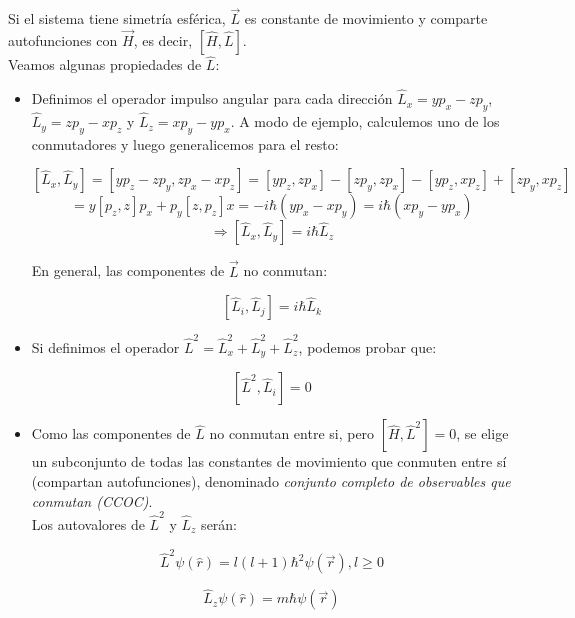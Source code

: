 \documentclass[a4paper]{article}
\begin{document}
Si el sistema tiene simetr\'ia esf\'erica, $\vec{L}$ es constante de movimiento y comparte autofunciones con $\vec{H}$, es decir, $[\hat{H},\hat{L}]$.\\

Veamos algunas propiedades de $\hat{L}$:

\begin{itemize}
\item Definimos el operador impulso angular para cada direcci\'on $\hat{L}_{x} = yp_{x} - zp_{y}$, $\hat{L}_{y} = zp_{y} - xp_{z}$ y $\hat{L}_{z} = xp_{y} - yp_{x}$. A modo de ejemplo, calculemos uno de los conmutadores y luego generalicemos para el resto:

$$[\hat{L}_{x}, \hat{L}_{y}] = [yp_{z} - zp_{y},zp_{x} - xp_{z}] = [yp_{z},zp_{x}] - [zp_{y},zp_{x}] - [yp_{z},xp_{z}] + [zp_{y},xp_{z}] $$ $$ = y[p_{z},z]p_{x} + p_{y}[z,p_{z}]x = -i\hbar(yp_{x} - xp_{y}) = i\hbar(xp_{y} - yp_{x})$$
$$ \Rightarrow [\hat{L}_{x}, \hat{L}_{y}] = i\hbar \hat{L}_{z}$$

En general, las componentes de $\vec{L}$ no conmutan:

\begin{equation}
\label{eq:ele}
[\hat{L}_{i}, \hat{L}_{j}] = i\hbar \hat{L}_{k}
\end{equation}

\item Si definimos el operador $\hat{L}^{2} = \hat{L}_{x}^{2} + \hat{L}_{y}^{2} + \hat{L}_{z}^{2}$, podemos probar que:

\begin{equation}
\label{eq:ele2}
[\hat{L}^{2}, \hat{L}_{i}] = 0
\end{equation}

\item Como las componentes de $\hat{L}$ no conmutan entre si, pero $[\hat{H}, \hat{L}^{2}] = 0$, se elige un subconjunto de todas las constantes de movimiento que conmuten entre s\'i (compartan autofunciones), denominado \textit{conjunto completo de observables que conmutan (CCOC)}.\\

Los autovalores de $\hat{L}^{2}$ y $\hat{L}_{z}$ ser\'an:

\begin{equation}
\label{eq:eigenvaluesL2}
\hat{L}^{2}\psi(\hat{r}) = l(l+1)\hbar^{2}\psi(\vec{r}), l \geq 0
\end{equation}

\begin{equation}
\label{eq:eigenvaluesLz}
\hat{L}_{z}\psi(\hat{r}) = m\hbar \psi(\vec{r})
\end{equation}


\end{itemize}
\end{document}
